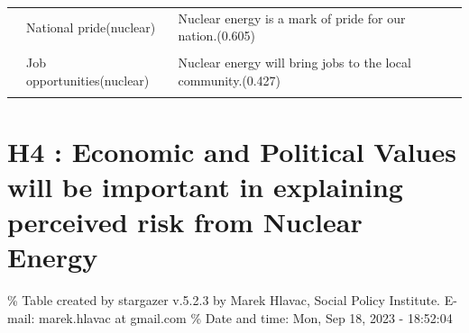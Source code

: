 \documentclass[
]{article}
\begin{document}
\begin{landscape}
\begin{longtable}[t]{>{\raggedright\arraybackslash}p{4cm}>{\raggedright\arraybackslash}p{4cm}>{\raggedright\arraybackslash}p{9cm}ll}
 & National pride(nuclear) & Nuclear energy is a mark of pride for our nation.(0.605) &  & \\
\addlinespace
\cellcolor{gray!6}{} & \cellcolor{gray!6}{Local prosperity(nuclear)} & \cellcolor{gray!6}{Nuclear energy brings economic prosperity to the surrounding regions.(0.586)} & \cellcolor{gray!6}{} & \cellcolor{gray!6}{}\\
 & Job opportunities(nuclear) & Nuclear energy will bring jobs to the local community.(0.427) &  & \\*
\end{longtable}
\end{landscape}

\newpage

\hypertarget{h4-economic-and-political-values-will-be-important-in-explaining-perceived-risk-from-nuclear-energy}{%
\section{H4 : Economic and Political Values will be important in
explaining perceived risk from Nuclear
Energy}\label{h4-economic-and-political-values-will-be-important-in-explaining-perceived-risk-from-nuclear-energy}}

\begingroup\setlength{\tabcolsep}{1pt}

\renewcommand{\arraystretch}{0.7}

\% Table created by stargazer v.5.2.3 by Marek Hlavac, Social Policy
Institute. E-mail: marek.hlavac at gmail.com \% Date and time: Mon, Sep
18, 2023 - 18:52:04
\end{document}
